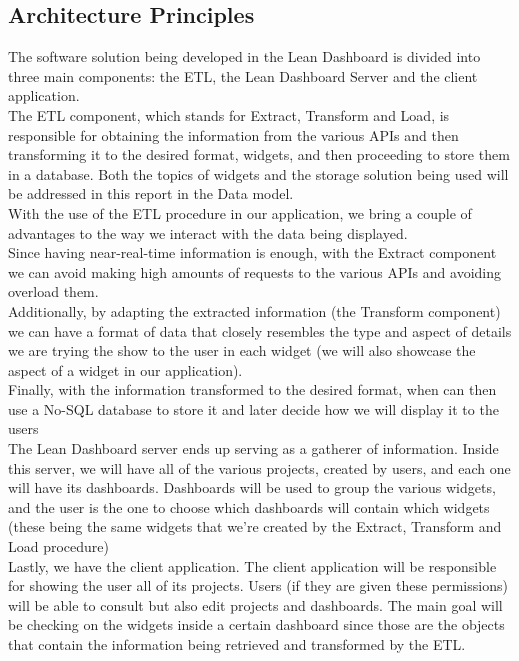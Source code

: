 \documentclass[a4paper,twoside,10pt]{report}
\begin{document}
\subsection{Architecture Principles}
The software solution being developed in the Lean Dashboard is divided into three main components: the ETL\cite{ETLPROC}, the Lean Dashboard Server and the client application.
\\ \newline
The ETL component, which stands for Extract, Transform and Load,  is responsible for obtaining the information from the various APIs and then transforming it to the desired format, widgets, and then proceeding to store them in a database. Both the topics of widgets and the storage solution being used will be addressed in this report in the Data model.
\\ \newline
With the use of the ETL procedure in our application, we bring a couple of advantages to the way we interact with the data being displayed.
\\ \newline
Since having near-real-time information is enough, with the Extract component we can avoid making high amounts of requests to the various APIs and avoiding overload them.
\\ \newline
Additionally, by adapting the extracted information (the Transform component) we can have a format of data that closely resembles the type and aspect of details we are trying the show to the user in each widget (we will also showcase the aspect of a widget in our application).
\\ \newline
Finally, with the information transformed to the desired format, when can then use a No-SQL database to store it and later decide how we will display it to the users 
\\ \newline
The Lean Dashboard server ends up serving as a gatherer of information. Inside this server, we will have all of the various projects, created by users, and each one will have its dashboards. Dashboards will be used to group the various widgets, and the user is the one to choose which dashboards will contain which widgets (these being the same widgets that we're created by the Extract, Transform and Load procedure)
\\ \newline
Lastly, we have the client application. The client application will be responsible for showing the user all of its projects. Users (if they are given these permissions) will be able to consult but also edit projects and dashboards. The main goal will be checking on the widgets inside a certain dashboard since those are the objects that contain the information being retrieved and transformed by the ETL.
\end{document}
